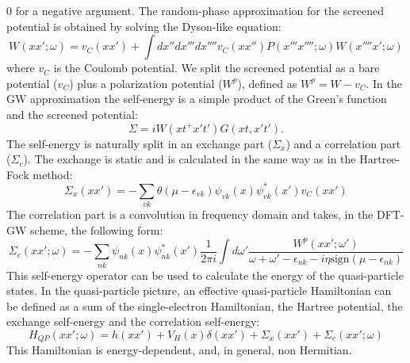 \documentclass[11pt]{article}
\begin{document}
0 for a negative argument.
The random-phase approximation for the
screened potential is obtained by solving the Dyson-like equation:
\begin{equation}
W(xx';\omega) = v_C(xx') +
  \int dx''dx'''dx''''v_C(xx'')P(x'''x'''';\omega)W(x''''x';\omega)
\end{equation}
where $v_C$ is the Coulomb potential.
We split the screened potential as a bare potential ($v_C$) plus
a polarization potential ($W^p$), defined as $W^p=W-v_C$.
In the GW approximation the self-energy is a simple product of the Green's
function and the screened potential:
\begin{equation} 
\Sigma=iW(xt^+x't')G(xt,x't').
\end{equation}
The self-energy is naturally split in 
an exchange part ($\Sigma_x$) and a 
correlation part ($\Sigma_c$).
The exchange is static and is calculated in the same way as
in the Hartree-Fock method:
\begin{equation}
\Sigma_x(xx') = - \sum_{vk} \theta(\mu-\epsilon_{vk}) \psi_{vk}(x)\psi^*_{vk}(x')v_C(xx')
\end{equation}
The correlation part is a convolution in frequency domain and takes, in the DFT-GW scheme, the following form:
\begin{equation}
\label{eq:sigmac-in-real-freqquency}
\Sigma_c(xx';\omega) =
-\sum_{nk} \psi_{nk}(x)\psi^*_{nk}(x')
\frac{1}{2\pi i} \int d\omega' \frac{W^p(xx';\omega')}{
\omega + \omega' - \epsilon_{nk} - i\eta\text{sign}(\mu-\epsilon_{nk})}
\end{equation}
This self-energy operator can be used to calculate the energy
of the quasi-particle states.
In the quasi-particle picture, an effective quasi-particle Hamiltonian
can be defined as a sum of
the single-electron Hamiltonian, the Hartree potential,
the exchange self-energy and the correlation self-energy:
\begin{equation}
H_{QP}(xx';\omega) = h(xx') + V_H(x)\delta(xx') + \Sigma_x(xx')
+ \Sigma_c(xx';\omega)
\end{equation}
This Hamiltonian is energy-dependent, and, in general, non Hermitian.
\end{document}

